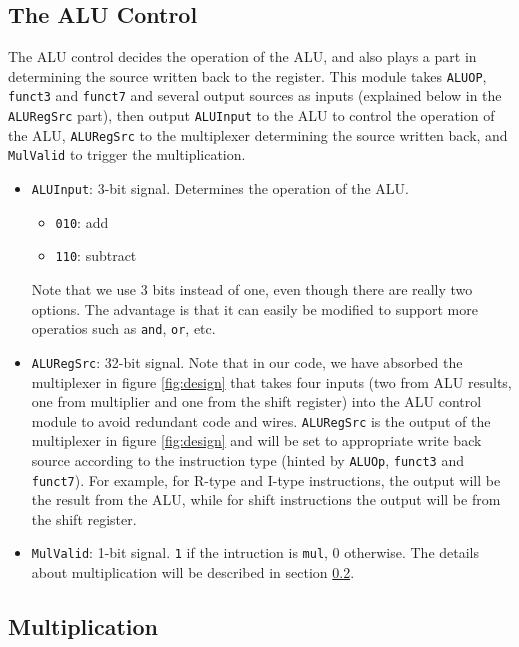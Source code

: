 \documentclass[12pt]{article}
\begin{document}
\subsection{The ALU Control}%
\label{sub:the_alu_control}

The ALU control decides the operation of the ALU, and also plays a part in
determining the source written back to the register. This module takes 
\texttt{ALUOP}, \texttt{funct3} and \texttt{funct7} and several output sources
as inputs (explained below in the \texttt{ALURegSrc} part), then output
\texttt{ALUInput} to the ALU to control the operation of the ALU,  
\texttt{ALURegSrc} to the multiplexer determining the source written back, and
\texttt{MulValid} to trigger the multiplication.

\begin{itemize}
	\item \texttt{ALUInput}: 3-bit signal. Determines the operation of the ALU.
		\begin{itemize}
			\item \texttt{010}: add
			\item \texttt{110}: subtract
		\end{itemize}
		Note that we use 3 bits instead of one, even though there are really
		two options. The advantage is that it can easily be modified to support 
		more operatios such as \texttt{and}, \texttt{or}, etc.

	\item \texttt{ALURegSrc}: 32-bit signal. Note that in our code, we have
		absorbed the multiplexer in figure \ref{fig:design} that takes four inputs
		(two from ALU results, one from multiplier and one from the shift register)
		into the ALU control module to avoid redundant code and wires. 
		\texttt{ALURegSrc} is the output of the multiplexer in figure \ref{fig:design}
		and will be set to appropriate write back source according
		to the instruction type (hinted by \texttt{ALUOp}, \texttt{funct3} and
		\texttt{funct7}). For example, for R-type and I-type instructions, the
		output will be the result from the ALU, while for shift instructions
		the output will be from the shift register.

	\item \texttt{MulValid}: 1-bit signal. \texttt{1} if the intruction is
		\texttt{mul}, 0 otherwise. The details about multiplication will be described
		in section \ref{sub:multiplication}.
\end{itemize}

\subsection{Multiplication}%
\label{sub:multiplication}
\end{document}
